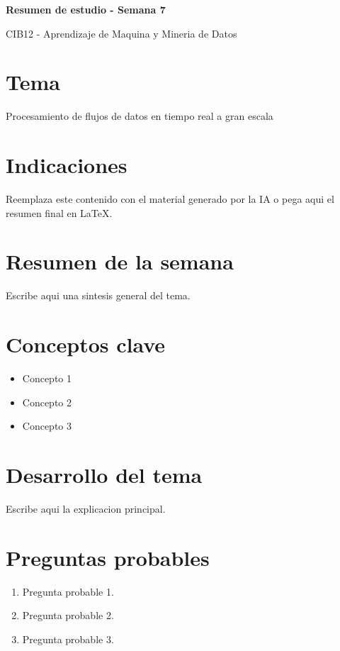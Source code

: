 \documentclass[8pt,a4paper,twocolumn]{article}
\newcommand{\resumentitulo}{Resumen de estudio - Semana 7}
\begin{document}
\vspace*{-1.0em}
\begin{tcolorbox}[colback=black!12,colframe=black!35,boxrule=0.3pt,arc=1pt,left=4pt,right=4pt,top=3pt,bottom=3pt]
{\bfseries\normalsize \resumentitulo\par}
{\scriptsize CIB12 - Aprendizaje de Maquina y Mineria de Datos\par}
\end{tcolorbox}
\vspace{0.15em}

\section*{Tema}
Procesamiento de flujos de datos en tiempo real a gran escala

\section*{Indicaciones}
Reemplaza este contenido con el material generado por la IA o pega aqui el resumen final en LaTeX.

\section*{Resumen de la semana}
Escribe aqui una sintesis general del tema.

\section*{Conceptos clave}
\begin{itemize}
    \item Concepto 1
    \item Concepto 2
    \item Concepto 3
\end{itemize}

\section*{Desarrollo del tema}
Escribe aqui la explicacion principal.

\section*{Preguntas probables}
\begin{enumerate}
    \item Pregunta probable 1.
    \item Pregunta probable 2.
    \item Pregunta probable 3.
\end{enumerate}
\end{document}
